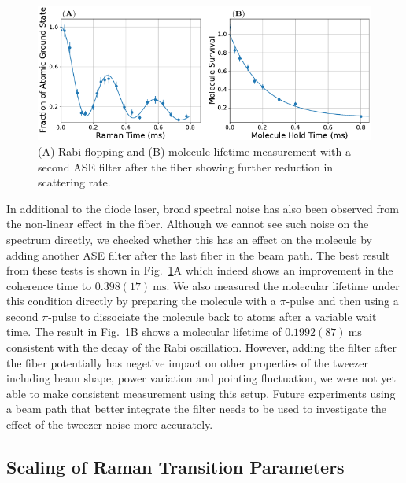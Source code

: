 \begin{figure}
  \centering
  \includegraphics[width=\textwidth]{figures/raman_transfer_fit_two_ase.pdf}
  \caption[Signal improvement with a second ASE filter after the fiber.]{
    (A) Rabi flopping and (B) molecule lifetime measurement
    with a second ASE filter after the fiber showing further reduction in scattering rate.
    \label{fig:raman-transfer:results:ase:two}}
\end{figure}

In additional to the diode laser, broad spectral noise has also been observed
from the non-linear effect in the fiber.
Although we cannot see such noise on the spectrum directly,
we checked whether this has an effect on the molecule by adding another ASE filter after
the last fiber in the beam path.
The best result from these tests is shown in Fig.~\ref{fig:raman-transfer:results:ase:two}A
which indeed shows an improvement in the coherence time to $0.398(17)~\mathrm{ms}$.
We also measured the molecular lifetime under this condition directly
by preparing the molecule with a $\pi$-pulse
and then using a second $\pi$-pulse to dissociate the molecule back to atoms
after a variable wait time.
The result in Fig.~\ref{fig:raman-transfer:results:ase:two}B
shows a molecular lifetime of $0.1992(87)~\mathrm{ms}$
consistent with the decay of the Rabi oscillation.
However, adding the filter after the fiber potentially has negetive impact
on other properties of the tweezer including beam shape,
power variation and pointing fluctuation,
we were not yet able to make consistent measurement using this setup.
Future experiments using a beam path that better integrate the filter
needs to be used to investigate the effect of the tweezer noise more accurately.

\subsection{Scaling of Raman Transition Parameters}
\label{ch:raman-transfer:results:scaling}

